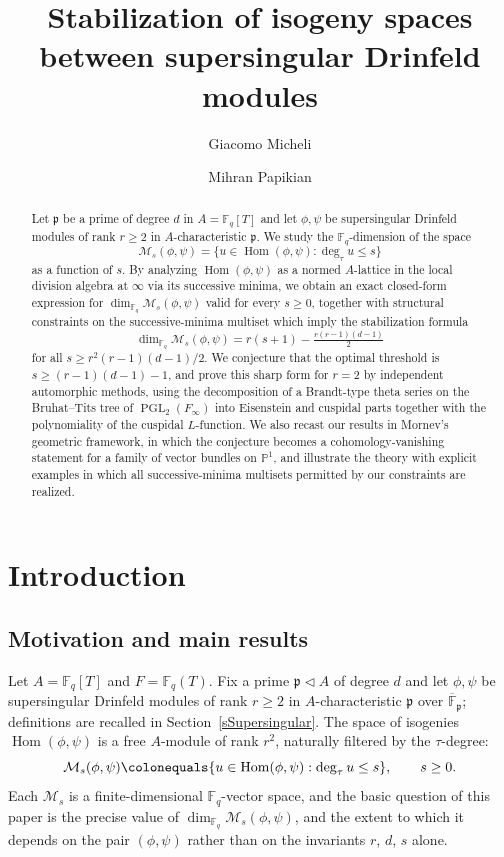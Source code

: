 \documentclass[12pt]{amsart}
\title[Stabilization of isogeny spaces]{Stabilization of isogeny spaces between supersingular Drinfeld modules}
\author{Giacomo Micheli}
\author{Mihran Papikian}
\theoremstyle{definition}
\theoremstyle{remark}
\numberwithin{equation}{section}
\numberwithin{thm}{section}
\DeclareMathOperator{\Hom}{Hom}
\DeclareMathOperator{\PGL}{PGL}
\newcommand{\fp}{\mathfrak{p}}
\newcommand{\cM}{\mathcal{M}}
\newcommand{\F}{\mathbb{F}}
\newcommand{\PP}{\mathbb{P}}
\newcommand{\Fi}{F_\infty}
\newcommand{\oF}{\overline{\F}}
\begin{document}
	
	
\begin{abstract}
	Let $\fp$ be a prime of degree $d$ in $A = \F_q[T]$ and let $\phi, \psi$ be supersingular Drinfeld modules of rank $r \geq 2$ in $A$-characteristic $\fp$. We study the $\F_q$-dimension of the space
	\[
	\cM_s(\phi, \psi) = \{u \in \Hom(\phi, \psi) : \deg_\tau u \leq s\}
	\]
	as a function of $s$. By analyzing $\Hom(\phi, \psi)$ as a normed $A$-lattice in the local division algebra at $\infty$ via its successive minima, we obtain an exact closed-form expression for $\dim_{\F_q}\cM_s(\phi, \psi)$ valid for every $s \geq 0$, together with structural constraints on the successive-minima multiset which imply the stabilization formula
	\[
	\dim_{\F_q}\cM_s(\phi, \psi) = r(s+1) - \tfrac{r(r-1)(d-1)}{2}
	\]
	for all $s \geq r^2(r-1)(d-1)/2$. We conjecture that the optimal threshold is $s \geq (r-1)(d-1) - 1$, and prove this sharp form for $r = 2$ by independent automorphic methods, using the decomposition of a Brandt-type theta series on the Bruhat--Tits tree of $\PGL_2(\Fi)$ into Eisenstein and cuspidal parts together with the polynomiality of the cuspidal $L$-function. We also recast our results in Mornev's geometric framework, in which the conjecture becomes a cohomology-vanishing statement for a family of vector bundles on $\PP^1$, and illustrate the theory with explicit examples in which all successive-minima multisets permitted by our constraints are realized.
\end{abstract}
	
	\maketitle
	
	
	\section{Introduction}
	
	\subsection*{Motivation and main results}
	Let $A = \F_q[T]$ and $F = \F_q(T)$. Fix a prime $\fp\lhd A$ of degree $d$ and let $\phi, \psi$ be supersingular Drinfeld modules of rank $r\geq 2$ in $A$-characteristic $\fp$ over $\oF_\fp$; definitions are recalled in Section~\ref{sSupersingular}. The space of isogenies $\Hom(\phi, \psi)$ is a free $A$-module of rank $r^2$, naturally filtered by the $\tau$-degree:
	\[
	\cM_s(\phi, \psi) \colonequals \{u \in \Hom(\phi, \psi) : \deg_\tau u \leq s\}, \qquad s\geq 0.
	\]
	Each $\cM_s$ is a finite-dimensional $\F_q$-vector space, and the basic question of this paper is the precise value of $\dim_{\F_q}\cM_s(\phi, \psi)$, and the extent to which it depends on the pair $(\phi, \psi)$ 
	rather than on the invariants $r$, $d$, $s$ alone.
	
\end{document}
